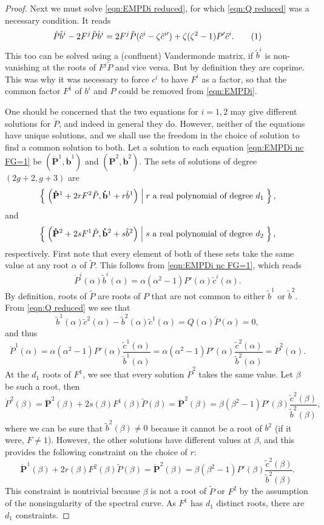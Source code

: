 \documentclass{article}
\begin{document}
\begin{lem}[Case (i)]
\begin{proof}
Next we must solve \eqref{eqn:EMPDi reduced}, for which \eqref{eqn:Q reduced} was a necessary condition. It reads
\[
\dot{P} \tilde{b}^i - 2 F^j \tilde{P} \dot{b}^i = 2 F^j \tilde{P} (\hat{c}^i - \zeta\hat{c}^{i\prime}) + \zeta(\zeta^2-1)P' \tilde{c}^i.
\labelthis{eqn:EMPDi nc FG=1}
\]
This too can be solved using a (confluent) Vandermonde matrix, if $\tilde{b}^i$ is non-vanishing at the roots of $F^j \tilde{P}$ and vice versa. But by definition they are coprime. This was why it was necessary to force $c^i$ to have $F^i$ as a factor, so that the common factor $F^1$ of $b^i$ and $P$ could be removed from \eqref{eqn:EMPDi}.

One should be concerned that the two equations for $i=1,2$ may give different solutions for $\dot P$, and indeed in general they do. However, neither of the equations have unique solutions, and we shall use the freedom in the choice of solution to find a common solution to both. Let a solution to each equation \eqref{eqn:EMPDi nc FG=1} be $(\mathbf{\dot{P}}^1, \mathbf{\dot{b}}^1)$ and $(\mathbf{\dot{P}}^2, \mathbf{\dot{b}}^2)$. The sets of solutions of degree $(2g+2,g+3)$ are
\[
\left\{\;  \left( \mathbf{\dot{P}}^1 + 2rF^2\tilde{P}, \mathbf{\dot{b}}^1 + r\tilde{b}^1 \right)  \;\middle|\;  r \text{ a real polynomial of degree } d_1  \;\right\},
\]
and
\[
\left\{\;  \left( \mathbf{\dot{P}}^2 + 2sF^1\tilde{P}, \mathbf{\dot{b}}^2 + s\tilde{b}^2 \right)  \;\middle|\;  s \text{ a real polynomial of degree } d_2  \;\right\},
\]
respectively. First note that every element of both of these sets take the same value at any root $\alpha$ of $\tilde{P}$. This follows from \eqref{eqn:EMPDi nc FG=1}, which reads
\[
\dot P^i(\alpha) \tilde{b}^i(\alpha) = \alpha(\alpha^2 -1) P'(\alpha) \tilde{c}^i(\alpha).
\]
By definition, roots of $\tilde{P}$ are roots of $P$ that are not common to either $\tilde{b}^1$ or $\tilde{b}^2$. From \eqref{eqn:Q reduced} we see that
\[
\tilde{b}^1(\alpha)\tilde{c}^2(\alpha) - \tilde{b}^2(\alpha)\tilde{c}^1(\alpha) = Q(\alpha)\tilde{P}(\alpha) = 0,
\]
and thus
\[
\dot P^1(\alpha)
= \alpha (\alpha^2 - 1) P'(\alpha) \frac{\tilde{c}^1(\alpha)}{\tilde{b}^1(\alpha)}
= \alpha (\alpha^2 - 1) P'(\alpha) \frac{\tilde{c}^2(\alpha)}{\tilde{b}^2(\alpha)}
= \dot P^2(\alpha).
\]
At the $d_1$ roots of $F^1$, we see that every solution $\dot{P}^2$ takes the same value. Let $\beta$ be such a root, then
\[
\dot{P}^2(\beta)
= \mathbf{\dot{P}}^2(\beta) + 2s(\beta)F^1(\beta)\tilde{P}(\beta)
= \mathbf{\dot{P}}^2(\beta)
= \beta (\beta^2-1) P'(\beta) \frac{\tilde{c}^2(\beta)}{\tilde{b}^2(\beta)},
\]
where we can be sure that $\tilde{b}^2(\beta) \neq 0$ because it cannot be a root of $b^2$ (if it were, $F\neq 1$). However, the other solutions have different values at $\beta$, and this provides the following constraint on the choice of $r$:
\[
\mathbf{\dot{P}}^1(\beta) + 2r(\beta)F^2(\beta)\tilde{P}(\beta) = \mathbf{\dot{P}}^2(\beta) = \beta (\beta^2-1) P'(\beta) \frac{\tilde{c}^2(\beta)}{\tilde{b}^2(\beta)}.
\]
This constraint is nontrivial because $\beta$ is not a root of $\tilde{P}$ or $F^2$ by the assumption of the nonsingularity of the spectral curve. As $F^1$ has $d_1$ distinct roots, there are $d_1$ constraints.


\end{proof}
\end{lem}
\end{document}

